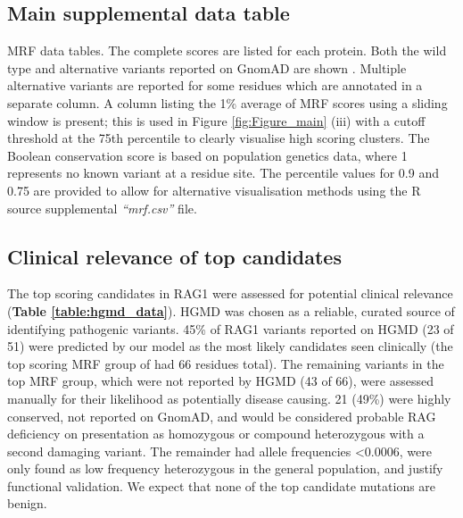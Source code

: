 \documentclass[preprint,11pt,fleqn]{elsarticle}
\begin{document}
\subsection*{\textbf{Main supplemental data table}} 
\begin{table}[h]
	\caption{MRF data tables. The complete scores are listed for each protein. 
Both the wild type and alternative variants reported on GnomAD are shown \citep{lek2016analysis}. 
Multiple alternative variants are reported for some residues which are annotated in a separate column. 
A column listing the 1\% average of MRF scores using a sliding window is present; this is used in Figure \ref{fig:Figure_main} (iii) with a cutoff threshold at the 75th percentile to clearly visualise high scoring clusters.
The Boolean conservation score is based on population genetics data, where 1 represents no known variant at a residue site. The percentile values for 0.9 and 0.75 are provided to allow for alternative visualisation methods using the R source supplemental \textit{``mrf.csv''} file.}
	\label{Table:1}
\end{table}

\subsection*{\textbf{Clinical relevance of top candidates}}
\noindent The top scoring candidates in RAG1 were assessed for potential clinical relevance 
(\textbf{Table \ref{table:hgmd_data}}). 
HGMD was chosen as a reliable, curated source of identifying pathogenic variants.
45\% of RAG1 variants reported on HGMD (23 of 51) were predicted by our model as the most likely candidates seen clinically (the top scoring MRF group of had 66 residues total).
The remaining variants in the top MRF group, which were not reported by HGMD (43 of 66), were assessed manually for their likelihood as potentially disease causing.
21 (49\%) were highly conserved, not reported on GnomAD, and would be considered probable RAG deficiency on presentation as homozygous or compound heterozygous with a second damaging variant.
The remainder had allele frequencies <0.0006, were only found as low frequency heterozygous in the general population, and justify functional validation.
We expect that none of the top candidate mutations are benign.
\end{document}

